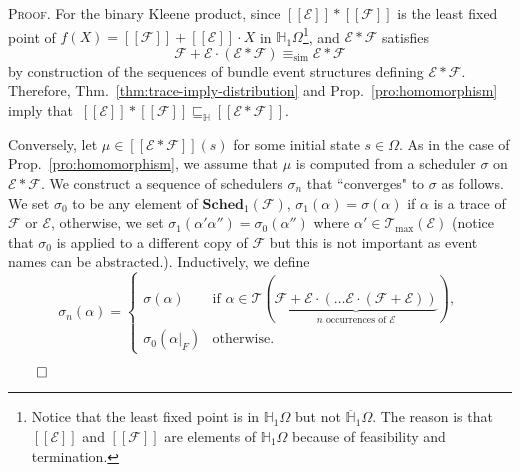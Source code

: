 \documentclass[review]{elsart}
\newenvironment{proof}{\par
\noindent
\textsc{Proof. }
\noindent}{\hfill\(\qed\)}
\renewcommand{\H}{\mathbb{H}}
\newcommand{\Hip}{\overline{\mathbb{H}}_1}
\newcommand{\EE}{\mathcal{E}}
\newcommand{\FF}{\mathcal{F}}
\newcommand{\TT}{\mathcal{T}}
\newcommand{\sched}{\mathbf{Sched}}
\newcommand{\sem}[1]{[\![#1]\!]}
\newcommand{\bks}{*}
\newcommand{\refbyh}{\sqsubseteq_{\mathbb{H}}}
\newcommand{\Prop}[1]{Prop.~\ref{#1}}
\newcommand{\Thm}[1]{Thm.~\ref{#1}}
\begin{document}
\begin{proof}
For the binary Kleene product, since $\sem{\EE}{\bks}\sem{\FF}$ is the least fixed point of $f(X) = \sem{\FF}{+} \sem{\EE}{\cdot} X$ in $\H_1\Omega$\footnote{Notice that the least fixed point is in $\H_1\Omega$ but not $\Hip\Omega$. The reason is that $\sem{\EE}$ and $\sem{\FF}$ are elements of $\H_1\Omega$ because of feasibility and termination.}, and $\EE{\bks}\FF$ satisfies 
\[
	\FF {+} \EE{\cdot}(\EE{\bks}\FF) \equiv_{\textrm{sim}} \EE{\bks}\FF
\]
by construction of the sequences of bundle event structures defining $\EE{\bks}\FF$. Therefore, \Thm{thm:trace-imply-distribution} and \Prop{pro:homomorphism} imply that $\ \sem{\EE}{\bks}\sem{\FF}\refbyh \sem{\EE{\bks}\FF}$. 

Conversely, let $\mu{\in} \sem{\EE{\bks}\FF}(s)$ for some initial state $s{\in}\Omega$. As in the case of \Prop{pro:homomorphism}, we assume that $\mu$ is computed from a scheduler $\sigma$ on $\EE{\bks}\FF$. We construct a sequence of schedulers $\sigma_n$ that ``converges" to $\sigma$ as follows. We set $\sigma_0$ to be any element of $\sched_1(\FF)$, $\sigma_1(\alpha) {=} \sigma(\alpha)$ if $\alpha$ is a trace of $\FF$ or $\EE$, otherwise, we set $\sigma_1(\alpha'\alpha'') {=} \sigma_0(\alpha'')$ where $\alpha'{\in}\TT_{\max}(\EE)$ (notice that $\sigma_0$ is applied to a different copy of $\FF$ but this is not important as event names can be abstracted.). Inductively, we define 
\begin{displaymath}
\sigma_{n}(\alpha) =\begin{cases}
\sigma(\alpha)&\textrm{if } \alpha{\in} \TT(\underbrace{\FF {+} \EE{\cdot}(\dots \EE{\cdot}(\FF {+} \EE))}_{n \textrm{ occurrences of }\EE}), \\
\sigma_{0}(\alpha|_F)&\textrm{otherwise.}
\end{cases}
\end{displaymath}  


\end{proof}
\end{document}
